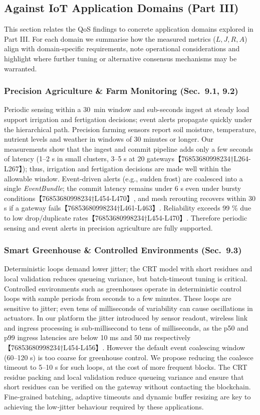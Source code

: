 \documentclass[12pt,onecolumn]{IEEEtran} %
\begin{document}
\subsection{Against IoT Application Domains (Part III)}
\label{subsec:domains}

This section relates the QoS findings to concrete application domains explored in Part III.  For each domain we summarise how the measured metrics (\(L,J,R,A\)) align with domain‑specific requirements, note operational considerations and highlight where further tuning or alternative consensus mechanisms may be warranted.

\subsubsection{Precision Agriculture \& Farm Monitoring (Sec.~9.1, 9.2)}
Periodic sensing within a 30~min window and sub-seconds ingest at steady load support irrigation and fertigation decisions; event alerts propagate quickly under the hierarchical path. Precision farming sensors report soil moisture, temperature, nutrient levels and weather in windows of 30 minutes or longer.  Our measurements show that the ingest and commit pipeline adds only a few seconds of latency (1–2 s in small clusters, 3–5 s at 20 gateways【76853680998234†L264-L267】); thus, irrigation and fertigation decisions are made well within the allowable window.  Event‑driven alerts (e.g., sudden frost) are coalesced into a single \emph{EventBundle}; the commit latency remains under 6 s even under bursty conditions【76853680998234†L454-L470】, and mesh rerouting recovers within 30 s if a gateway fails【76853680998234†L461-L463】.  Reliability exceeds 99 \% due to low drop/duplicate rates【76853680998234†L454-L470】.  Therefore periodic sensing and event alerts in precision agriculture are fully supported.

\subsubsection{Smart Greenhouse \& Controlled Environments (Sec.~9.3)}
Deterministic loops demand lower jitter; the CRT model with short residues and local validation reduces queueing variance, but batch-timeout tuning is critical. Controlled environments such as greenhouses operate in deterministic control loops with sample periods from seconds to a few minutes.  These loops are sensitive to jitter; even tens of milliseconds of variability can cause oscillations in actuators.  In our platform the jitter introduced by sensor readout, wireless link and ingress processing is sub‑millisecond to tens of milliseconds, as the p50 and p99 ingress latencies are below 10 ms and 50 ms respectively【76853680998234†L454-L456】.  However the default event coalescing window (60–120 s) is too coarse for greenhouse control.  We propose reducing the coalesce timeout to 5–10 s for such loops, at the cost of more frequent blocks.  The CRT residue packing and local validation reduce queueing variance and ensure that short residues can be verified on the gateway without contacting the blockchain.  Fine‑grained batching, adaptive timeouts and dynamic buffer resizing are key to achieving the low‑jitter behaviour required by these applications.
\end{document}
